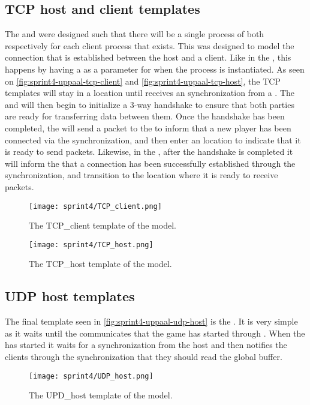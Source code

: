 \subsection*{TCP host and client templates}
The  and  were designed such that there will be a single process of both respectively for each client process that exists.
This was designed to model the connection that is established between the host and a client.
Like in the , this happens by having a  as a parameter for when the process is instantiated.
As seen on \autoref{fig:sprint4-uppaal-tcp-client} and \autoref{fig:sprint4-uppaal-tcp-host}, the TCP templates will stay in a  location until  receives an  synchronization from a .
The  and  will then begin to initialize a 3-way handshake to ensure that both parties are ready for transferring data between them.
Once the handshake has been completed, the  will send a packet to the  to inform that a new player has been connected via the  synchronization, and then enter an  location to indicate that it is ready to send packets.
Likewise, in the , after the handshake is completed it will inform the  that a connection has been successfully established through the  synchronization, and transition to the  location where it is ready to receive packets.

\begin{figure}[h]
    \centering
    \texttt{[image: sprint4/TCP\_client.png]}
    \caption{The TCP\_client template of the \uppaal model.}
    \label{fig:sprint4-uppaal-tcp-client}
\end{figure}

\begin{figure}[h]
    \centering
    \texttt{[image: sprint4/TCP\_host.png]}
    \caption{The TCP\_host template of the \uppaal model.}
    \label{fig:sprint4-uppaal-tcp-host}
\end{figure}

\subsection*{UDP host templates}
The final template seen in \autoref{fig:sprint4-uppaal-udp-host} is the .
It is very simple as it waits until the  communicates that the game has started through .
When the  has started it waits for a  synchronization from the host and then notifies the clients through the  synchronization that they should read the global buffer.
\begin{figure}[h]
    \centering
    \texttt{[image: sprint4/UDP\_host.png]}
    \caption{The UPD\_host template of the \uppaal model.}
    \label{fig:sprint4-uppaal-udp-host}
\end{figure}

